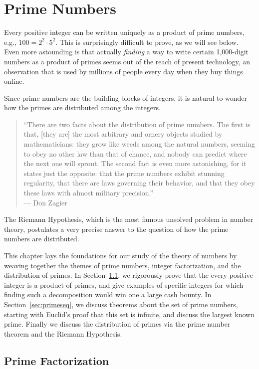 \chapter{Prime Numbers}
\label{ch:prime}
Every positive integer can be written uniquely as a product of prime
numbers, e.g., $100 = 2^2 \cdot 5^2$.  This is surprisingly difficult
to prove, as we will see below.  Even more astounding is that actually
{\em finding} a way to write certain 1,000-digit numbers as a product
of primes seems out of the reach of present technology, an observation
that is used by millions of people every day when they buy things
online.

Since prime numbers are the building blocks of integers, it is
natural to wonder how the primes are distributed among the integers.
\begin{quote}
  ``There are two facts about the distribution of prime numbers. The
  first is that, [they are] the most arbitrary and ornery objects
  studied by mathematicians: they grow like weeds among the natural
  numbers, seeming to obey no other law than that of chance, and
  nobody can predict where the next one will sprout. The second fact
  is even more astonishing, for it states just the opposite: that the
  prime numbers exhibit stunning regularity, that there are laws
  governing their behavior, and that they obey these laws with almost
  military precision.''\\\mbox{} \hspace{2in} --- Don Zagier \cite{zagier:primes50}
\end{quote}
The Riemann Hypothesis, which is the most famous unsolved problem in
number theory, postulates a very precise answer to the question of
how the prime numbers are distributed.

This chapter lays the foundations for our study of the theory of
numbers by weaving together the themes of prime numbers, integer
factorization, and the distribution of primes.  In
Section~\ref{sec:fundamental_thm}, we rigorously prove that the every
positive integer is a product of primes, and give examples of specific
integers for which finding such a decomposition would win one a large
cash bounty.  In Section~\ref{sec:primeseq}, we discuss theorems about
the set of prime numbers, starting with
Euclid's proof that this set is infinite, and discuss the
largest known prime.  Finally we discuss the distribution of primes
via the prime number theorem and the Riemann Hypothesis.

\section{Prime Factorization}
\label{sec:fundamental_thm}
